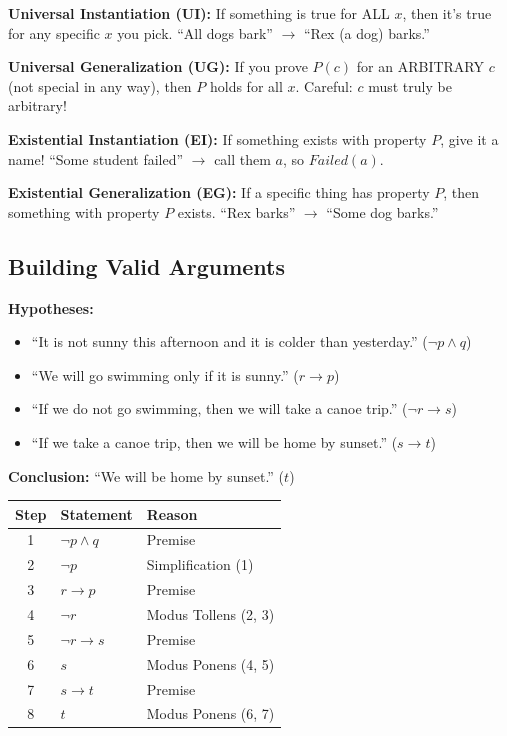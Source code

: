 \documentclass[11pt,a4paper]{article}
\begin{document}
\begin{tipbox}
\textbf{Universal Instantiation (UI):} If something is true for ALL $x$, then it's true for any specific $x$ you pick. ``All dogs bark'' $\to$ ``Rex (a dog) barks.''

\textbf{Universal Generalization (UG):} If you prove $P(c)$ for an ARBITRARY $c$ (not special in any way), then $P$ holds for all $x$. Careful: $c$ must truly be arbitrary!

\textbf{Existential Instantiation (EI):} If something exists with property $P$, give it a name! ``Some student failed'' $\to$ call them $a$, so $Failed(a)$.

\textbf{Existential Generalization (EG):} If a specific thing has property $P$, then something with property $P$ exists. ``Rex barks'' $\to$ ``Some dog barks.''
\end{tipbox}

\subsection{Building Valid Arguments}

\begin{examplebox}
\textbf{Hypotheses:}
\begin{itemize}[noitemsep]
    \item ``It is not sunny this afternoon and it is colder than yesterday.'' ($\neg p \land q$)
    \item ``We will go swimming only if it is sunny.'' ($r \to p$)
    \item ``If we do not go swimming, then we will take a canoe trip.'' ($\neg r \to s$)
    \item ``If we take a canoe trip, then we will be home by sunset.'' ($s \to t$)
\end{itemize}

\textbf{Conclusion:} ``We will be home by sunset.'' ($t$)

\begin{center}
\begin{tabular}{c|l|l}
\toprule
\textbf{Step} & \textbf{Statement} & \textbf{Reason} \\
\midrule
1 & $\neg p \land q$ & Premise \\
2 & $\neg p$ & Simplification (1) \\
3 & $r \to p$ & Premise \\
4 & $\neg r$ & Modus Tollens (2, 3) \\
5 & $\neg r \to s$ & Premise \\
6 & $s$ & Modus Ponens (4, 5) \\
7 & $s \to t$ & Premise \\
8 & $t$ & Modus Ponens (6, 7) \\
\bottomrule
\end{tabular}
\end{center}
\end{examplebox}
\end{document}
